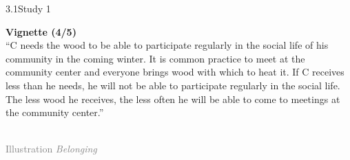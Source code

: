 \documentclass[xcolor=table,9pt,aspectratio=169]{beamer}
\begin{document}
\begin{frame}{\vspace*{10mm}3.1\hspace*{1em}Study 1}
\begin{multicols}{2}
   \textbf{Vignette (4/5)}\\
   \medskip
   \enquote{C needs the wood to be able to participate regularly in the social life of his community in the coming winter.
   It is common practice to meet at the community center and everyone brings wood with which to heat it.
   If C receives less than he needs, he will not be able to participate regularly in the social life.
   The less wood he receives, the less often he will be able to come to meetings at the community center.}
   \vfill
   \begin{center}
      \\
      \textcolor{gray}{Illustration \textit{Belonging}}
   \end{center}
\end{multicols}
\end{frame}
\end{document}
